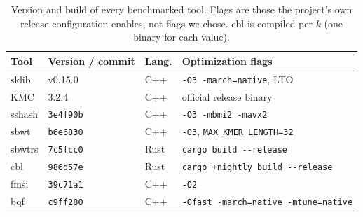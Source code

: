 \documentclass[runningheads,a4paper]{llncs}
\newcommand{\sklib}{\textsf{sklib}\xspace}
\newcommand{\kmc}{\textsf{KMC}\xspace}
\newcommand{\sbwt}{\textsf{sbwt}\xspace}
\newcommand{\sbwtrs}{\textsf{sbwtrs}\xspace}
\newcommand{\sshash}{\textsf{sshash}\xspace}
\newcommand{\cbl}{\textsf{cbl}\xspace}
\newcommand{\fmsi}{\textsf{fmsi}\xspace}
\newcommand{\bqf}{\textsf{bqf}\xspace}
\newif\ifrevmarkup\revmarkupfalse
\newcommand{\rev}[1]{\ifrevmarkup\textcolor{blue}{#1}\else#1\fi}
\newenvironment{revblock}{\ifrevmarkup\color{blue}\fi}{}
\begin{document}
\begin{revblock}
\begin{table}[h]
\centering
\caption{\rev{Version and build of every benchmarked tool. Flags are those the project's own release configuration enables, not flags we chose. \cbl{} is compiled per $k$ (one binary for each value).}}
\label{tab:versions}
\small
\setlength{\tabcolsep}{4pt}
\begin{revblock}
\begin{tabular}{llll}
\toprule
Tool & Version / commit & Lang. & Optimization flags \\
\midrule
\sklib{}  & v0.15.0              & C++  & \texttt{-O3 -march=native}, LTO \\
\kmc{}    & 3.2.4                & C++  & official release binary \\
\sshash{} & \texttt{3e4f90b}     & C++  & \texttt{-O3 -mbmi2 -mavx2} \\
\sbwt{}   & \texttt{b6e6830}     & C++  & \texttt{-O3}, \texttt{MAX\_KMER\_LENGTH=32} \\
\sbwtrs{} & \texttt{7c5fcc0}     & Rust & \texttt{cargo build -{}-release} \\
\cbl{}    & \texttt{986d57e}     & Rust & \texttt{cargo +nightly build -{}-release} \\
\fmsi{}   & \texttt{39c71a1}     & C++  & \texttt{-O2} \\
\bqf{}    & \texttt{c9ff280}     & C++  & \texttt{-Ofast -march=native -mtune=native} \\
\bottomrule
\end{tabular}
\end{revblock}
\end{table}

\end{revblock}
\end{document}

